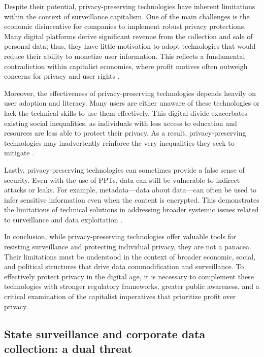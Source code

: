 \begin{refsection}
Despite their potential, privacy-preserving technologies have inherent limitations within the context of surveillance capitalism. One of the main challenges is the economic disincentive for companies to implement robust privacy protections. Many digital platforms derive significant revenue from the collection and sale of personal data; thus, they have little motivation to adopt technologies that would reduce their ability to monetize user information. This reflects a fundamental contradiction within capitalist economies, where profit motives often outweigh concerns for privacy and user rights \cite[pp.~112-115]{noble2019algorithms}.

Moreover, the effectiveness of privacy-preserving technologies depends heavily on user adoption and literacy. Many users are either unaware of these technologies or lack the technical skills to use them effectively. This digital divide exacerbates existing social inequalities, as individuals with less access to education and resources are less able to protect their privacy. As a result, privacy-preserving technologies may inadvertently reinforce the very inequalities they seek to mitigate \cite[pp.~45-47]{eubanks2018automating}.

Lastly, privacy-preserving technologies can sometimes provide a false sense of security. Even with the use of PPTs, data can still be vulnerable to indirect attacks or leaks. For example, metadata—data about data—can often be used to infer sensitive information even when the content is encrypted. This demonstrates the limitations of technical solutions in addressing broader systemic issues related to surveillance and data exploitation \cite[pp.~56-58]{schneier2015data}.

In conclusion, while privacy-preserving technologies offer valuable tools for resisting surveillance and protecting individual privacy, they are not a panacea. Their limitations must be understood in the context of broader economic, social, and political structures that drive data commodification and surveillance. To effectively protect privacy in the digital age, it is necessary to complement these technologies with stronger regulatory frameworks, greater public awareness, and a critical examination of the capitalist imperatives that prioritize profit over privacy.

\subsection{State surveillance and corporate data collection: a dual threat}


\end{refsection}
